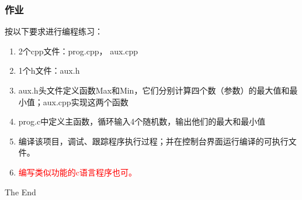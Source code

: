 \documentclass{beamer}
\begin{document}
\begin{frame}
\frametitle{作业}
按以下要求进行编程练习：
\begin{enumerate}
\item
2个cpp文件：prog.cpp， aux.cpp
\item
1个h文件：aux.h
\item
aux.h头文件定义函数Max和Min，它们分别计算四个数（参数）的最大值和最小值；aux.cpp实现这两个函数
\item
prog.c中定义主函数，循环输入4个随机数，输出他们的最大和最小值
\item
编译该项目，调试、跟踪程序执行过程；并在控制台界面运行编译的可执行文件。
\item
\textcolor{red}{编写类似功能的c语言程序也可。}
\end{enumerate}
\end{frame}



\begin{frame}
\Huge{\centerline{The End}}
\end{frame}

\end{document}

